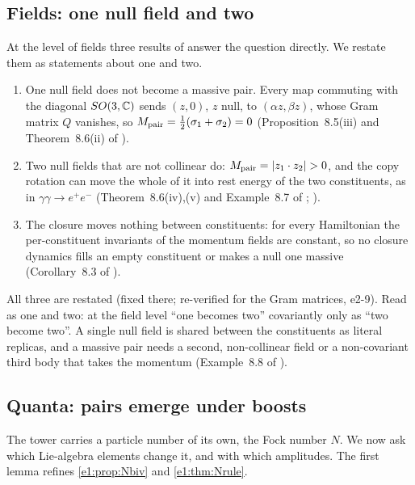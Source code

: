 \subsection{Fields: one null field and two}
\label{e2:sec:field}

At the level of fields three results of \cite{RE} answer the question directly. We restate them as statements about one and two.

\begin{corollary}
\label{e2:cor:field}
\begin{enumerate}[label=(\roman*),leftmargin=2.2em]
\item One null field does not become a massive pair. Every map commuting with the diagonal $SO(3,\mathbb{C})$ sends $(z,0)$, $z$ null, to
$(\alpha z,\beta z)$, whose Gram matrix $Q$ vanishes, so $M_{\rm pair}=\tfrac12(\sigma_1+\sigma_2)=0$ (Proposition~8.5(iii) and Theorem~8.6(ii) of \cite{RE}).
\item Two null fields that are not collinear do: $M_{\rm pair}=|z_1\cdot z_2|>0$, and the copy rotation can move the whole of it into rest
energy of the two constituents, as in $\gamma\gamma\to e^+e^-$ (Theorem~8.6(iv),(v) and Example~8.7 of \cite{RE}; \cite{BreitWheeler34}).
\item The closure moves nothing between constituents: for every Hamiltonian the per-constituent invariants of the momentum fields are
constant, so no closure dynamics fills an empty constituent or makes a null one massive (Corollary~8.3 of \cite{RE}).
\end{enumerate}
\end{corollary}

All three are restated (fixed there; re-verified for the Gram matrices, e2-9). Read as one and two: at the field level ``one becomes two''
covariantly only as ``two become two''. A single null field is shared between the constituents as literal replicas, and a massive pair
needs a second, non-collinear field or a non-covariant third body that takes the momentum (Example~8.8 of \cite{RE}).

\subsection{Quanta: pairs emerge under boosts}
\label{e2:sec:quanta}

The tower carries a particle number of its own, the Fock number $N$. We now ask which Lie-algebra elements change it, and with which
amplitudes. The first lemma refines \cref{e1:prop:Nbiv} and \cref{e1:thm:Nrule}.

